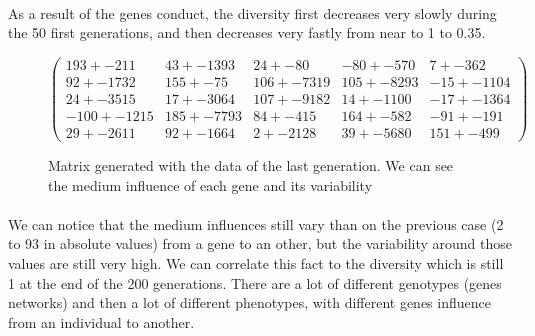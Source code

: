 \documentclass[]{report} %
\begin{document}
    \paragraph*{} 
    As a result of the genes conduct, the diversity first decreases very slowly during the 50 first generations, and then decreases very fastly from near to 1 to 0.35. 
   

    \begin{figure}[H] 
            \centering
            \small
    $
            \begin{pmatrix}
                  193 +- 211 & 43 +- 1393 & 24 +- 80 & -80 +- 570 & 7 +- 362 \\
                  92 +- 1732 & 155 +- 75 & 106 +- 7319 & 105 +- 8293 & -15 +- 1104 \\
                  24 +- 3515 & 17 +- 3064 & 107 +- 9182 & 14 +- 1100 & -17 +- 1364 \\
                  -100 +- 1215 & 185 +- 7793 & 84 +- 415 & 164 +- 582 & -91 +- 191 \\
                  29 +- 2611 & 92 +- 1664 & 2 +- 2128 & 39 +- 5680 & 151 +- 499 
            \end{pmatrix}
    $
            \caption{\footnotesize Matrix generated with the data of the last generation. We can see the medium influence of each gene and its variability}
            \label{mat:ps300xg200xmr1-10-5}
    \end{figure}
    \paragraph*{}
    We can notice that the medium influences still vary than on the previous case (2 to 93 in absolute values) from a gene to an other, but the variability around those values are still very high. We can correlate this fact to the diversity which is still 1 at the end of the 200 generations. There are a lot of different genotypes (genes networks) and then a lot of different phenotypes, with different genes influence from an individual to another.
    
\end{document}

